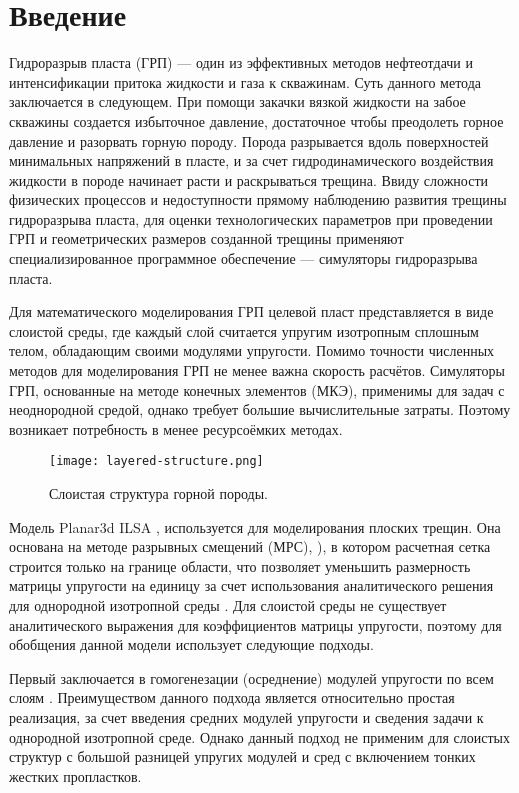 \chapter*{Введение}                         %

Гидроразрыв пласта (ГРП) — один из эффективных методов нефтеотдачи и интенсификации притока жидкости и газа к скважинам. Суть данного метода заключается в следующем. При помощи закачки вязкой жидкости на забое скважины создается избыточное давление, достаточное чтобы преодолеть горное давление и разорвать горную породу. Порода разрывается вдоль поверхностей минимальных напряжений в пласте, и за счет гидродинамического воздействия жидкости в породе начинает расти и раскрываться трещина. Ввиду сложности физических процессов и недоступности прямому наблюдению развития трещины гидроразрыва пласта, для оценки технологических параметров при проведении ГРП и геометрических размеров созданной трещины применяют специализированное программное обеспечение — симуляторы гидроразрыва пласта.

Для математического моделирования ГРП целевой пласт представляется в виде слоистой среды, где каждый слой считается упругим изотропным сплошным телом, обладающим своими модулями упругости. Помимо точности численных методов для моделирования ГРП не менее важна скорость расчётов. Симуляторы ГРП, основанные на методе конечных элементов (МКЭ), применимы для задач с неоднородной средой, однако требует большие вычислительные затраты. Поэтому возникает потребность в менее ресурсоёмких методах.

\begin{figure}[htbp]
    \centering
    \texttt{[image: layered-structure.png]}
    \caption{Слоистая структура горной породы.}
\end{figure}

Модель Planar3d ILSA \cite{DONTSOV201753}, используется для моделирования плоских трещин. Она основана на методе разрывных смещений (МРС), \cite{dispalecement_discontinuty_Crouch1983}), в котором расчетная сетка строится только на границе области, что позволяет уменьшить размерность матрицы упругости на единицу за счет использования аналитического решения для однородной изотропной среды \cite{Peir2008}. Для слоистой среды не существует аналитического выражения для коэффициентов матрицы упругости, поэтому для обобщения данной модели использует следующие подходы.

Первый заключается в гомогенезации (осреднение) модулей упругости по всем слоям \cite{DONTSOV2021108144}. Преимуществом данного подхода является относительно простая реализация, за счет введения средних модулей упругости и сведения задачи к однородной изотропной среде. Однако данный подход не применим для слоистых структур с большой разницей упругих модулей и сред с включением тонких жестких пропластков.

